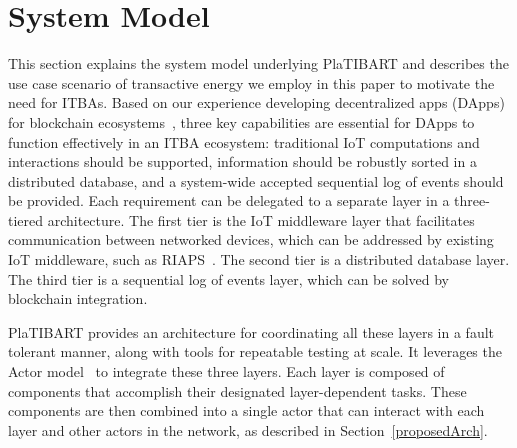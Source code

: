 \section{System Model}
\label{system_model}

This section explains the system model underlying PlaTIBART and describes the use case scenario of transactive energy we employ in this paper to motivate the need for ITBAs.
%
Based on our experience developing decentralized apps (DApps) for blockchain ecosystems~\cite{Zhang2016,dubey2017resilience},  three key capabilities are essential for DApps to function effectively in an ITBA ecosystem: traditional IoT computations and interactions should be supported, information should be robustly sorted in a distributed database, and a system-wide accepted sequential log of events should be provided. Each requirement can be delegated to a separate layer in a three-tiered architecture.  The first tier is the IoT middleware layer that facilitates communication between networked devices, which can be addressed by existing IoT middleware, such as RIAPS~\cite{RIAPS_IEEE_ISORC_2017}. The second tier is a distributed database layer. The third tier is a sequential log of events layer, which can be solved by blockchain integration. 

PlaTIBART provides an architecture for coordinating all these layers in a fault tolerant manner, along with tools for repeatable testing at scale. It leverages the Actor model~\cite{lee2003actor} to integrate these three layers. Each layer is composed of components that accomplish their designated layer-dependent tasks. These components are then combined into a single actor that can interact with each layer and other actors in the network, as described in Section~\ref{proposedArch}. 


